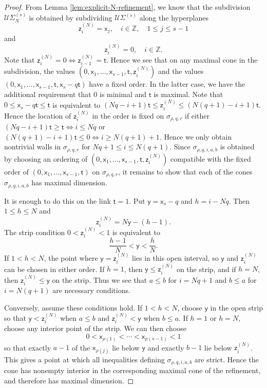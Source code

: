 \documentclass[11pt]{article}
\theoremstyle{definition}
\begin{document}
\begin{proof}
	From Lemma \ref{lem:explicit-N-refinement}, we know that the subdivision $\mathcal U\Sigma_N^{(s)}$ is obtained by
	subdividing $\mathcal U\Sigma^{(s)}$ along the hyperplanes
	$$\mathsf{z}_{i}^{(N)}=\mathsf{x}_j,\quad i\in \mathbb{Z},\quad 1\le j\le s-1$$
	and
	$$\mathsf{z}_{i}^{(N)}=0,\quad i\in \mathbb{Z}.$$
	Note that $\mathsf{z}_{i}^{(N)}=0\Leftrightarrow \mathsf{z}_{i-1}^{(N)}=\mathsf{t}$.
	Hence we see that on any maximal cone in the subdivision,
	the values $(0,\mathsf{x}_1,\dots,\mathsf{x}_{s-1},\mathsf{t},\mathsf{z}_i^{(N)})$ and the values $(0,\mathsf{x}_1,\dots,\mathsf{x}_{s-1},\mathsf{t},\mathsf{x}_s-q\mathsf{t})$ have a fixed order.
	In the latter case, we have the additional requirement that $0$ is minimal and $\mathsf{t}$ is maximal. Note that $0\le \mathsf{x}_s-q\mathsf{t}\le \mathsf{t}$
	is equivalent to $(Nq-i+1)\mathsf{t}\le \mathsf{z}_i^{(N)}\le (N(q+1)-i+1)\mathsf{t}$. Hence the location of $\mathsf{z}_{i}^{(N)}$ in the order
	is fixed on $\sigma_{\rho,q,r}$ if either $(Nq-i+1)\mathsf{t}\ge \mathsf{t}\Leftrightarrow i\le Nq$ or $(N(q+1)-i+1)\mathsf{t}\le 0\Leftrightarrow i\ge N(q+1)+1$.
	Hence we only obtain nontrivial walls in $\sigma_{\rho,q,r}$
	for $Nq+1\le i\le N(q+1)$. Since $\sigma_{\rho,q,i,a,b}$
	is obtained by choosing an ordering of $(0,\mathsf{x}_1,\dots,\mathsf{x}_{s-1},\mathsf{t},\mathsf{z}_i^{(N)})$ compatible with the fixed order
	of $(0,\mathsf{x}_1,\dots,\mathsf{x}_{s-1},\mathsf{t})$ on $\sigma_{\rho,q,r}$, it
	remains to show that each of the cones $\sigma_{\rho,q,i,a,b}$
	has maximal dimension.

	It is enough to do this on the link $\mathsf{t}=1$. Put $\mathsf{y}=\mathsf{x}_s-q$ and $h=i-Nq$. Then $1\le h\le N$ and
	\[
		\mathsf{z}_i^{(N)}=N\mathsf{y}-(h-1).
	\]
	The strip condition $0<\mathsf{z}_i^{(N)}<1$ is equivalent to
	\[
		\frac{h-1}{N}<\mathsf{y}<\frac{h}{N}.
	\]
	If $1<h<N$, the point where $\mathsf{y}=\mathsf{z}_i^{(N)}$ lies in this open interval, so $\mathsf{y}$ and $\mathsf{z}_i^{(N)}$ can be chosen in either
	order. If $h=1$, then $\mathsf{y}\le \mathsf{z}_i^{(N)}$ on the strip, and if $h=N$, then $\mathsf{z}_i^{(N)}\le \mathsf{y}$ on the strip. Thus we
	see that $a\le b$ for $i=Nq+1$ and $b\le a$ for $i=N(q+1)$ are necessary conditions.

	Conversely, assume these conditions hold. If $1<h<N$, choose $\mathsf{y}$ in the open strip so that $\mathsf{y}<\mathsf{z}_i^{(N)}$ when
	$a\le b$ and $\mathsf{z}_i^{(N)}<\mathsf{y}$ when $b\le a$. If $h=1$ or $h=N$, choose any interior point of the strip. We can then choose
	\[
		0<\mathsf{x}_{\rho(1)}<\cdots <\mathsf{x}_{\rho(s-1)}<1
	\]
	so that exactly $a-1$ of the $\mathsf{x}_{\rho(j)}$ lie below $\mathsf{y}$ and exactly $b-1$ lie below $\mathsf{z}_i^{(N)}$. This gives a point
	at which all inequalities defining $\sigma_{\rho,q,i,a,b}$ are strict. Hence the cone has nonempty interior in the
	corresponding maximal cone of the refinement, and therefore has maximal dimension.
\end{proof}
\end{document}
